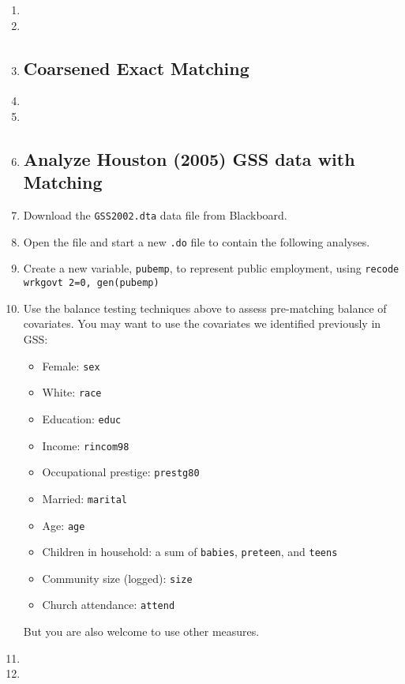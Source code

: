 \documentclass[a4paper,12pt]{article}
\begin{document}
\begin{enumerate}
\item %

\item %
\item %


\subsection*{Coarsened Exact Matching}

\item %
\item %
\item %


\subsection*{Analyze Houston (2005) GSS data with Matching}

\item Download the \texttt{GSS2002.dta} data file from Blackboard.
\item Open the file and start a new \texttt{.do} file to contain the following analyses.

\item Create a new variable, \texttt{pubemp}, to represent public employment, using \texttt{recode wrkgovt 2=0, gen(pubemp)}
\item Use the balance testing techniques above to assess pre-matching balance of covariates. You may want to use the covariates we identified previously in GSS:
	\begin{itemize}
	\item Female: \texttt{sex}
	\item White: \texttt{race}
	\item Education: \texttt{educ}
	\item Income: \texttt{rincom98}
	\item Occupational prestige: \texttt{prestg80}
	\item Married: \texttt{marital}
	\item Age: \texttt{age}
	\item Children in household: a sum of \texttt{babies}, \texttt{preteen}, and \texttt{teens}
	\item Community size (logged): \texttt{size}
	\item Church attendance: \texttt{attend}
	\end{itemize}
But you are also welcome to use other measures.

\item %
\item %

\end{enumerate}
\end{document}
